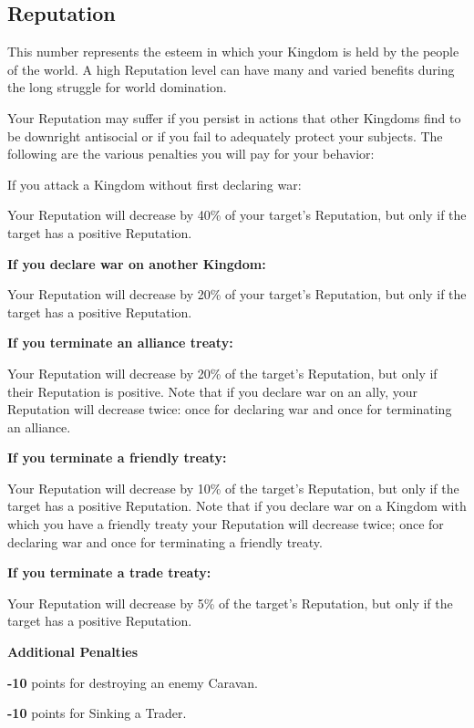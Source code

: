 \subsection{Reputation}


This number represents the esteem in which your Kingdom is held by the people of the world. A high Reputation level can have many and varied benefits during the long struggle for world domination.

Your Reputation may suffer if you persist in actions that other Kingdoms find to be downright antisocial or if you fail to adequately protect your subjects. The following are the various penalties you will pay for your behavior:

\begin{adjustwidth}{1cm}{}
If you attack a Kingdom without first declaring war:

Your Reputation will decrease by 40\% of your target’s Reputation, but only if the target has a positive Reputation.

\textbf{If you declare war on another Kingdom:}

Your Reputation will decrease by 20\% of your target’s Reputation, but only if the target has a positive Reputation.

\textbf{If you terminate an alliance treaty:}

Your Reputation will decrease by 20\% of the target’s Reputation, but only if their Reputation is positive. Note that if you declare war on an ally, your Reputation will decrease twice: once for declaring war and once for terminating an alliance.

\textbf{If you terminate a friendly treaty: }

Your Reputation will decrease by 10\% of the target’s Reputation, but only if the target has a positive Reputation. Note that if you declare war on a Kingdom with which you have a friendly treaty your Reputation will decrease twice; once for declaring war and once for terminating a friendly treaty.

\textbf{If you terminate a trade treaty:}

Your Reputation will decrease by 5\% of the target’s Reputation, but
only if the target has a positive Reputation.

\textbf{Additional Penalties}

\textbf{-10} points for destroying an enemy Caravan.

\textbf{-10} points for Sinking a Trader.


\end{adjustwidth}
